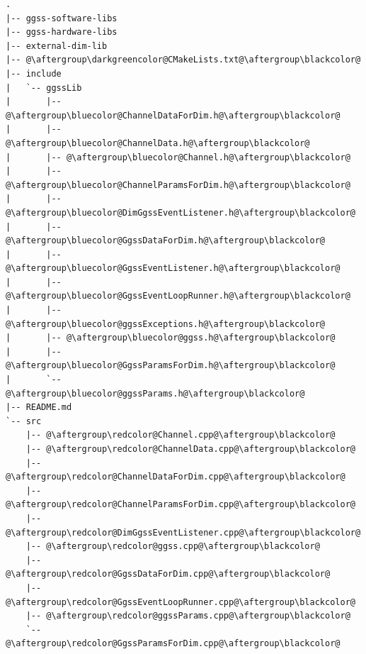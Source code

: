 \begin{lstlisting}[caption={Nowa struktura biblioteki \textbf{ggss-lib}}, label={lst:newLibStructure}, escapechar=@]
.
|-- ggss-software-libs
|-- ggss-hardware-libs
|-- external-dim-lib
|-- @\aftergroup\darkgreencolor@CMakeLists.txt@\aftergroup\blackcolor@
|-- include
|   `-- ggssLib
|       |-- @\aftergroup\bluecolor@ChannelDataForDim.h@\aftergroup\blackcolor@
|       |-- @\aftergroup\bluecolor@ChannelData.h@\aftergroup\blackcolor@
|       |-- @\aftergroup\bluecolor@Channel.h@\aftergroup\blackcolor@
|       |-- @\aftergroup\bluecolor@ChannelParamsForDim.h@\aftergroup\blackcolor@
|       |-- @\aftergroup\bluecolor@DimGgssEventListener.h@\aftergroup\blackcolor@
|       |-- @\aftergroup\bluecolor@GgssDataForDim.h@\aftergroup\blackcolor@
|       |-- @\aftergroup\bluecolor@GgssEventListener.h@\aftergroup\blackcolor@
|       |-- @\aftergroup\bluecolor@GgssEventLoopRunner.h@\aftergroup\blackcolor@
|       |-- @\aftergroup\bluecolor@ggssExceptions.h@\aftergroup\blackcolor@
|       |-- @\aftergroup\bluecolor@ggss.h@\aftergroup\blackcolor@
|       |-- @\aftergroup\bluecolor@GgssParamsForDim.h@\aftergroup\blackcolor@
|       `-- @\aftergroup\bluecolor@ggssParams.h@\aftergroup\blackcolor@
|-- README.md
`-- src
    |-- @\aftergroup\redcolor@Channel.cpp@\aftergroup\blackcolor@
    |-- @\aftergroup\redcolor@ChannelData.cpp@\aftergroup\blackcolor@
    |-- @\aftergroup\redcolor@ChannelDataForDim.cpp@\aftergroup\blackcolor@
    |-- @\aftergroup\redcolor@ChannelParamsForDim.cpp@\aftergroup\blackcolor@
    |-- @\aftergroup\redcolor@DimGgssEventListener.cpp@\aftergroup\blackcolor@
    |-- @\aftergroup\redcolor@ggss.cpp@\aftergroup\blackcolor@
    |-- @\aftergroup\redcolor@GgssDataForDim.cpp@\aftergroup\blackcolor@
    |-- @\aftergroup\redcolor@GgssEventLoopRunner.cpp@\aftergroup\blackcolor@
    |-- @\aftergroup\redcolor@ggssParams.cpp@\aftergroup\blackcolor@
    `-- @\aftergroup\redcolor@GgssParamsForDim.cpp@\aftergroup\blackcolor@

\end{lstlisting}

\newpage

